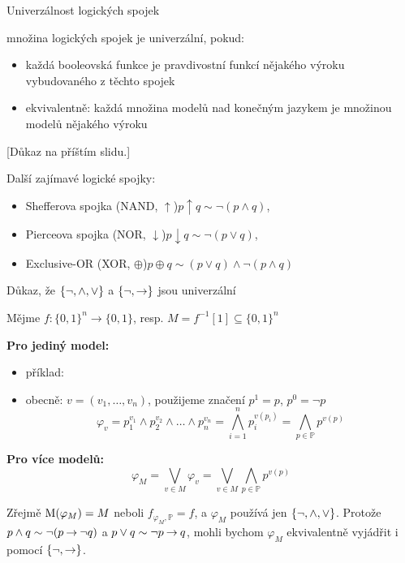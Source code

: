 \documentclass{beamer}
\begin{document}
\begin{frame}{Univerzálnost logických spojek}

    množina logických spojek je \alert{univerzální}, pokud:
    \begin{itemize}        
        \item každá booleovská funkce je pravdivostní funkcí nějakého výroku vybudovaného z těchto spojek
        \item ekvivalentně: každá množina modelů nad konečným jazykem je množinou modelů nějakého výroku
    \end{itemize}

    {\footnotesize [Důkaz na příštím slidu.]}


Další zajímavé logické spojky:
\begin{itemize}
    \item \alert{Shefferova spojka} (NAND, $\uparrow$)\hfill $p\uparrow q \sim \neg (p\land q)$,
    \item \alert{Pierceova spojka} (NOR, $\downarrow$)\hfill $p\downarrow q \sim \neg (p\lor q)$,
    \item \alert{Exclusive-OR} (XOR, $\oplus$)\hfill $p\oplus q \sim (p\lor q)\land\neg(p\land q)$
\end{itemize}

\end{frame}


\begin{frame}{Důkaz, že $\{\neg, {\land},{\lor}\}$ a $\{\neg, {\mathbin{\rightarrow}}\}$ jsou univerzální}  

    Mějme $f\colon \{0,1\}^n\to \{0,1\}$, resp. $M=f^{-1}[1]\subseteq \{0,1\}^n$
 
    \textbf{Pro jediný model:} 

    \begin{itemize}
        \item příklad: 
        \item obecně: $v=(v_1,\dots,v_n)$, použijeme značení $p^1=p$, $p^0=\neg p$
        $$
        \varphi_v = p_1^{v_1}\land p_2^{v_2}\land \dots\land p_n^{v_n}=\bigwedge_{i=1}^n p_i^{v(p_i)}=\bigwedge_{p\in\mathbb P}p^{v(p)}
        $$    
    \end{itemize}
    
    \textbf{Pro více modelů:} 
    $$
    \varphi_M = \bigvee_{v\in M}\varphi_v=\bigvee_{v\in M}\bigwedge_{p\in\mathbb P}p^{v(p)}
    $$

    Zřejmě $\operatorname{M}(\varphi_M)=M$ neboli $f_{\varphi_M,\mathbb P}=f$, a $\varphi_M$ používá jen $\{\neg, {\land},{\lor}\}$. Protože $p\land q\sim \neg (p\mathbin{\rightarrow} \neg q)$ a $p\lor q\sim \neg p\mathbin{\rightarrow} q$, mohli bychom $\varphi_M$ ekvivalentně vyjádřit i pomocí  $\{\neg, {\mathbin{\rightarrow}}\}$. \hfill\qedsymbol   

\end{frame}
\end{document}
